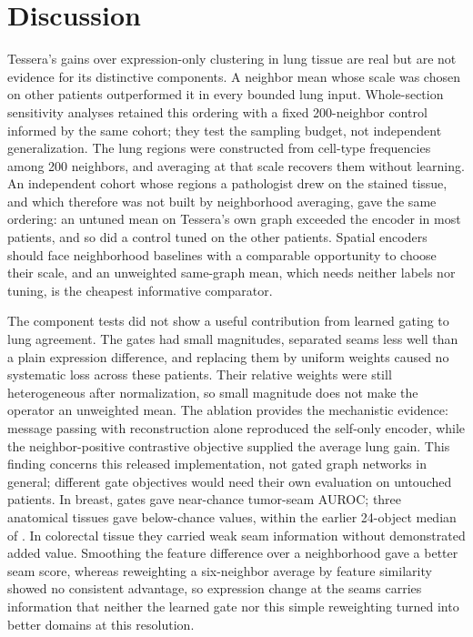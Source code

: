 \documentclass[11pt]{article}
\begin{document}
\section{Discussion}

Tessera's gains over expression-only clustering in lung tissue are real but are not evidence for its distinctive components. A neighbor mean whose scale was chosen on other patients outperformed it in every bounded lung input. Whole-section sensitivity analyses retained this ordering with a fixed 200-neighbor control informed by the same cohort; they test the sampling budget, not independent generalization. The lung regions were constructed from cell-type frequencies among 200 neighbors, and averaging at that scale recovers them without learning. An independent cohort whose regions a pathologist drew on the stained tissue, and which therefore was not built by neighborhood averaging, gave the same ordering: an untuned mean on Tessera's own graph exceeded the encoder in most patients, and so did a control tuned on the other patients. Spatial encoders should face neighborhood baselines with a comparable opportunity to choose their scale, and an unweighted same-graph mean, which needs neither labels nor tuning, is the cheapest informative comparator.

The component tests did not show a useful contribution from learned gating to lung agreement. The gates had small magnitudes, separated seams less well than a plain expression difference, and replacing them by uniform weights caused no systematic loss across these patients. Their relative weights were still heterogeneous after normalization, so small magnitude does not make the operator an unweighted mean. The ablation provides the mechanistic evidence: message passing with reconstruction alone reproduced the self-only encoder, while the neighbor-positive contrastive objective supplied the average lung gain. This finding concerns this released implementation, not gated graph networks in general; different gate objectives would need their own evaluation on untouched patients. In breast, gates gave near-chance tumor-seam AUROC; three anatomical tissues gave below-chance values, within the earlier 24-object median of \LandGateMedian{}. In colorectal tissue they carried weak seam information without demonstrated added value. Smoothing the feature difference over a neighborhood gave a better seam score, whereas reweighting a six-neighbor average by feature similarity showed no consistent advantage, so expression change at the seams carries information that neither the learned gate nor this simple reweighting turned into better domains at this resolution.
\end{document}
